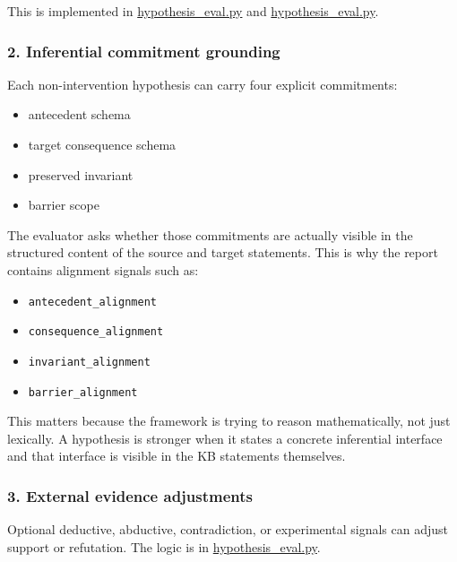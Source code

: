 \documentclass[
]{article}
\providecommand{\tightlist}{%
  \setlength{\itemsep}{0pt}\setlength{\parskip}{0pt}}
\begin{document}
This is implemented in
\href{/Users/user/files/abducer/abducer/skills/common/hypothesis_eval.py:755}{hypothesis\_eval.py}
and
\href{/Users/user/files/abducer/abducer/skills/common/hypothesis_eval.py:969}{hypothesis\_eval.py}.

\subsubsection{2. Inferential commitment
grounding}\label{2-inferential-commitment-grounding}

Each non-intervention hypothesis can carry four explicit commitments:

\begin{itemize}
\tightlist
\item
  antecedent schema
\item
  target consequence schema
\item
  preserved invariant
\item
  barrier scope
\end{itemize}

The evaluator asks whether those commitments are actually visible in the
structured content of the source and target statements. This is why the
report contains alignment signals such as:

\begin{itemize}
\tightlist
\item
  \texttt{antecedent\_alignment}
\item
  \texttt{consequence\_alignment}
\item
  \texttt{invariant\_alignment}
\item
  \texttt{barrier\_alignment}
\end{itemize}

This matters because the framework is trying to reason mathematically,
not just lexically. A hypothesis is stronger when it states a concrete
inferential interface and that interface is visible in the KB statements
themselves.

\subsubsection{3. External evidence
adjustments}\label{3-external-evidence-adjustments}

Optional deductive, abductive, contradiction, or experimental signals
can adjust support or refutation. The logic is in
\href{/Users/user/files/abducer/abducer/skills/common/hypothesis_eval.py:620}{hypothesis\_eval.py}.
\end{document}
